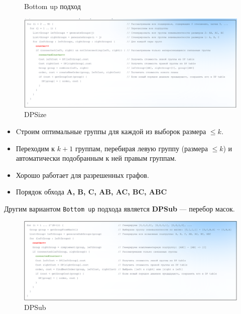 \documentclass[11pt]{article}
\begin{document}
\begin{figure}[h!]
\begin{minipage}{0.2\textwidth}
            \caption{Bottom up подход}
        \end{minipage}
        \begin{minipage}{0.8\textwidth}
            \centering
            \includegraphics[width=\textwidth]{Pictures/Dynamic Programming/Bottom up/DBSize}
            \caption{DPSize}
        \end{minipage}
    \end{figure}

    \begin{itemize}
        \item Cтроим оптимальные группы для каждой из выборок размера $\leq k$.
        \item Переходим к $k+1$ группам, перебирая левую группу (размера $\leq k$) и автоматически подобранным к ней правым группам.
        \item Хорошо работает для разрешенных графов.
        \item Порядок обхода \textbf{A, B, C, AB, AC, BC, ABC}
    \end{itemize}

    Другим вариантом \texttt{Bottom up} подхода является \textbf{DPSub} --- перебор масок.

    \begin{figure}[h!]
        \centering
        \includegraphics[width=\textwidth]{Pictures/Dynamic Programming/Bottom up/DPSub}
        \caption{DPSub}
    \end{figure}
\end{document}
